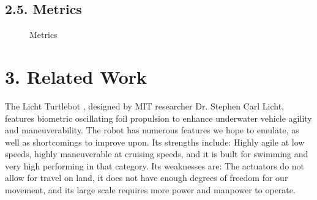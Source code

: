 \documentclass[10pt]{article}
\begin{document}
\subsection{2.5. Metrics}
\begin{figure}
\caption{Metrics}
\label{fig:metrics}
\end{figure}
%
%
%
%
%
%
%
%
%
%
%
%
%
%
%

\section{3. Related Work}
The Licht Turtlebot \cite{licht2008biomimetic}, designed by MIT researcher Dr. Stephen Carl Licht, features biometric oscillating foil propulsion to enhance underwater vehicle agility and maneuverability. The robot has numerous features we hope to emulate, as well as shortcomings to improve upon. Its strengths include: Highly agile at low speeds, highly maneuverable at cruising speeds, and it is built for swimming and very high performing in that category. Its weaknesses are: The actuators do not allow for travel on land, it does not have enough degrees of freedom for our movement, and its large scale requires more power and manpower to operate. 
\end{document}
